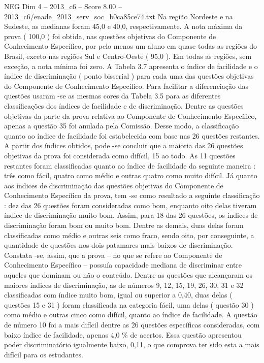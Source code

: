 \begin{textsample}{NEG Dim 4 – 2013\_c6 – Score 8.00 – 2013\_c6/enade\_2013\_serv\_soc\_b0ca85ce74.txt}
Na região Nordeste e na Sudeste, as medianas foram 45,0 e 40,0, respectivamente.
A nota máxima da prova ( 100,0 ) foi obtida, nas questões objetivas do Componente de Conhecimento Específico, por pelo menos um aluno em quase todas as regiões do Brasil, exceto nas regiões Sul e Centro-Oeste ( 95,0 ).
Em todas as regiões, sem exceção, a nota mínima foi zero.
A Tabela 3.7 apresenta o índice de facilidade e o índice de discriminação ( ponto bisserial ) para cada uma das questões objetivas do Componente de Conhecimento Específico.
Para facilitar a diferenciação das questões usaram -se as mesmas cores da Tabela 3.5 para as diferentes classificações dos índices de facilidade e de discriminação.
Dentre as questões objetivas da parte da prova relativa ao Componente de Conhecimento Específico, apenas a questão 35 foi anulada pela Comissão.
Desse modo, a classificação quanto ao índice de facilidade foi estabelecida com base nas 26 questões restantes.
A partir dos índices obtidos, pode -se concluir que a maioria das 26 questões objetivas da prova foi considerada como difícil, 15 ao todo.
As 11 questões restantes foram classificadas quanto ao índice de facilidade da seguinte maneira : três como fácil, quatro como médio e outras quatro como muito difícil.
Já quanto aos índices de discriminação das questões objetivas do Componente de Conhecimento Específico da prova, tem -se como resultado a seguinte classificação : dez das 26 questões foram consideradas como bom, enquanto oito delas tiveram índice de discriminação muito bom.
Assim, para 18 das 26 questões, os índices de discriminação foram bom ou muito bom.
Dentre as demais, duas delas foram classificadas como médio e outras seis como fraco, sendo oito, por conseguinte, a quantidade de questões nos dois patamares mais baixos de discriminação.
Constata -se, assim, que a prova – no que se refere ao Componente de Conhecimento Específico – possuía capacidade mediana de discriminar entre aqueles que dominam ou não o conteúdo.
Dentre as questões que alcançaram os maiores índices de discriminação, as de números 9, 12, 15, 19, 26, 30, 31 e 32 classificadas com índice muito bom, igual ou superior a 0,40, duas delas ( questões 15 e 31 ) foram classificada na categoria fácil, uma delas ( questão 30 ) como médio e outras cinco como difícil, quanto ao índice de facilidade.
A questão de número 10 foi a mais difícil dentre as 26 questões específicas consideradas, com baixo índice de facilidade, apenas 4,0 \% de acertos.
Essa questão apresentou poder discriminatório igualmente baixo, 0,11, o que comprova ter sido esta a mais difícil para os estudantes.

\end{textsample}
